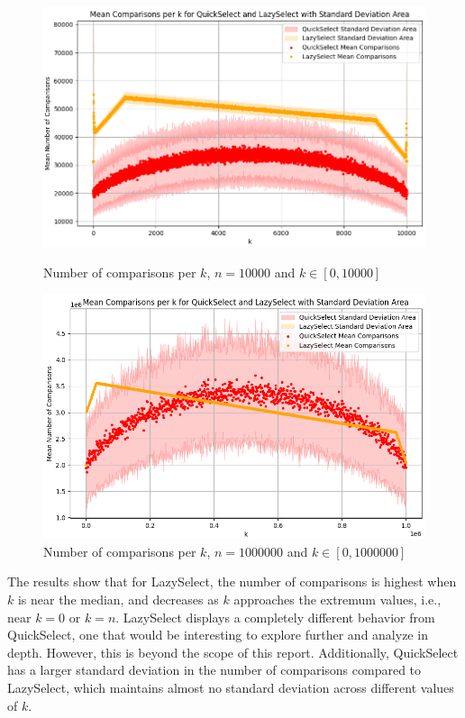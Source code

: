 \documentclass{article}
\begin{document}
\begin{figure}[H]
    \centering
    \begin{minipage}{0.45\textwidth}
        \centering
        \includegraphics[width=\textwidth]{assets1/graphics/comparisons_results_k_10000_100.png}
        \caption{Number of comparisons per $k$, $n = 10000$ and $k \in [0, 10000]$}
    \end{minipage}
    \hfill
    \begin{minipage}{0.45\textwidth}
        \centering
        \includegraphics[width=\textwidth]{assets1/graphics/comparisons_results_k_1000000_100.png}
        \caption{Number of comparisons per $k$, $n = 1000000$ and $k \in [0, 1000000]$}
    \end{minipage}
\end{figure}

The results show that for LazySelect, the number of comparisons is highest when \(k\) is near the median, and decreases as \(k\) approaches the extremum values, i.e., near \(k = 0\) or \(k = n\). LazySelect displays a completely different behavior from QuickSelect, one that would be interesting to explore further and analyze in depth. However, this is beyond the scope of this report. Additionally, QuickSelect has a larger standard deviation in the number of comparisons compared to LazySelect, which maintains almost no standard deviation across different values of \(k\). 
\end{document}
